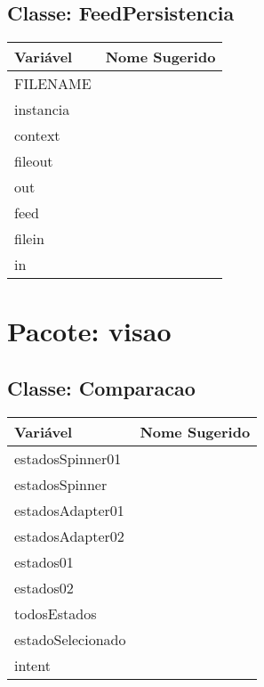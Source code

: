 \documentclass[12pt]{article}
\begin{document}
	\subsection{Classe: FeedPersistencia}
		\begin{table}[H]
			\begin{center}
				\begin{tabular}{l | l}
					\toprule
						Variável & Nome Sugerido\\
					\midrule
						FILENAME & \\
						instancia & \\
						context & \\
						fileout & \\
						out & \\
						feed & \\
						filein & \\
						in & \\
					\bottomrule
				\end{tabular}
			\end{center}
		\end{table}

\newpage
\section{Pacote: visao}
	\subsection{Classe: Comparacao}
		\begin{table}[H]
			\begin{center}
				\begin{tabular}{l | l}
					\toprule
						Variável & Nome Sugerido\\
					\midrule
						estadosSpinner01 & \\
						estadosSpinner & \\
						estadosAdapter01 & \\
						estadosAdapter02 & \\
						estados01 & \\
						estados02 & \\
						todosEstados & \\
						estadoSelecionado & \\
						intent & \\
					\bottomrule
				\end{tabular}
			\end{center}
		\end{table}
\end{document}
